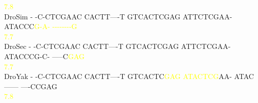 \documentclass[11pt,twoside,reqno,a4paper]{article}
\begin{document}
{\hspace*{7\charwidth}\hspace*{1\charwidth}\hspace*{1\charwidth}\hspace*{1\charwidth}\hspace*{28\charwidth}\textcolor{Yellow}{7.8}\hspace*{1\charwidth}\hspace*{1\charwidth}\hspace*{1\charwidth}\\
DroSim	-	-C-CTCGAAC	CACTT----T	GTCACTCGAG	ATTCTCGAA-	ATACCC\textcolor{Yellow}{G}\textcolor{Yellow}{-}\textcolor{Yellow}{A}\textcolor{Yellow}{-}	\textcolor{Yellow}{-}\textcolor{Yellow}{-}\textcolor{Yellow}{-}\textcolor{Yellow}{-}\textcolor{Yellow}{-}\textcolor{Yellow}{-}\textcolor{Yellow}{-}\textcolor{Yellow}{-}\textcolor{Yellow}{G}\\
\hspace*{7\charwidth}\hspace*{1\charwidth}\hspace*{1\charwidth}\hspace*{1\charwidth}\hspace*{1\charwidth}\hspace*{1\charwidth}\hspace*{47\charwidth}\textcolor{Yellow}{7.7}\hspace*{1\charwidth}\\
DroSec	-	-C-CTCGAAC	CACTT----T	GTCACTCGAG	ATTCTCGAA-	ATACCCG-C-	-----C\textcolor{Yellow}{G}\textcolor{Yellow}{A}\textcolor{Yellow}{G}\\
\hspace*{7\charwidth}\hspace*{1\charwidth}\hspace*{1\charwidth}\hspace*{1\charwidth}\hspace*{1\charwidth}\hspace*{1\charwidth}\hspace*{1\charwidth}\hspace*{57\charwidth}\textcolor{Yellow}{7.7}\hspace*{1\charwidth}\\
DroYak	-	-C-CTCGAAC	CACTT----T	GTCACTC\textcolor{Yellow}{G}\textcolor{Yellow}{A}\textcolor{Yellow}{G}	\textcolor{Yellow}{A}\textcolor{Yellow}{T}\textcolor{Yellow}{A}\textcolor{Yellow}{C}\textcolor{Yellow}{T}\textcolor{Yellow}{C}\textcolor{Yellow}{G}AA-	ATAC------	----CCGAG\\
\hspace*{7\charwidth}\hspace*{1\charwidth}\hspace*{1\charwidth}\hspace*{1\charwidth}\hspace*{28\charwidth}\textcolor{Yellow}{7.8}\hspace*{1\charwidth}\hspace*{1\charwidth}\hspace*{1\charwidth}\\
}
\end{document}
